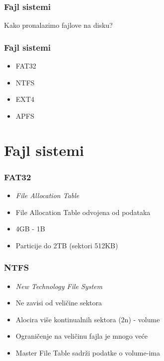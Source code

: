\documentclass{beamer}
\begin{document}
\begin{frame}
    \frametitle{Fajl sistemi}
    \begin{center}
        \LARGE{Kako pronalazimo fajlove na disku?}
    \end{center}

\end{frame}

\begin{frame}
    \frametitle{Fajl sistemi}
    \begin{itemize}
        \item FAT32 \newline
        \item NTFS \newline   
        \item EXT4 \newline
        \item APFS
    \end{itemize}
\end{frame}

\section*{Fajl sistemi}

\begin{frame}
    \frametitle{FAT32}
    \begin{itemize}
        \item \textit{File Allocation Table} \newline
        \item File Allocation Table odvojena od podataka \newline
        \item 4GB - 1B \newline
        \item Particije do 2TB (sektori 512KB)
    \end{itemize}
\end{frame}

\begin{frame}
    \frametitle{NTFS}
    \begin{itemize}
        \item \textit{New Technology File System} \newline
        \item Ne zavisi od veličine sektora \newline
        \item Alocira više kontinualnih sektora (2n) - volume \newline
        \item Ograničenje na veličinu fajla je mnogo veće \newline
        \item Master File Table sadrži podatke o volume-ima
    \end{itemize}
\end{frame}
\end{document}
